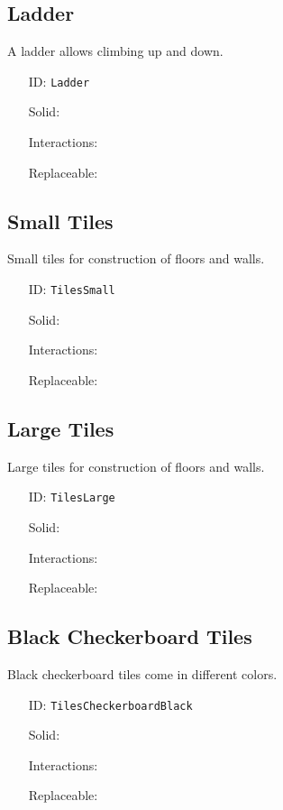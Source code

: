 \subsection{Ladder}\label{subsec:blocks_ladder}
A ladder allows climbing up and down.
\newline
\begin{itemize}[nosep]
    \item[ID:] \texttt{Ladder}
    \item[Solid:]  \XSolidBrush \item[Interactions:]  \XSolidBrush \item[Replaceable:]  \XSolidBrush
\end{itemize}

\subsection{Small Tiles}\label{subsec:blocks_small tiles}
Small tiles for construction of floors and walls.
\newline
\begin{itemize}[nosep]
    \item[ID:] \texttt{TilesSmall}
    \item[Solid:]  \Checkmark \item[Interactions:]  \XSolidBrush \item[Replaceable:]  \XSolidBrush
\end{itemize}

\subsection{Large Tiles}\label{subsec:blocks_large tiles}
Large tiles for construction of floors and walls.
\newline
\begin{itemize}[nosep]
    \item[ID:] \texttt{TilesLarge}
    \item[Solid:]  \Checkmark \item[Interactions:]  \XSolidBrush \item[Replaceable:]  \XSolidBrush
\end{itemize}

\subsection{Black Checkerboard Tiles}\label{subsec:blocks_black checkerboard tiles}
Black checkerboard tiles come in different colors.
\newline
\begin{itemize}[nosep]
    \item[ID:] \texttt{TilesCheckerboardBlack}
    \item[Solid:]  \Checkmark \item[Interactions:]  \Checkmark \item[Replaceable:]  \XSolidBrush
\end{itemize}

